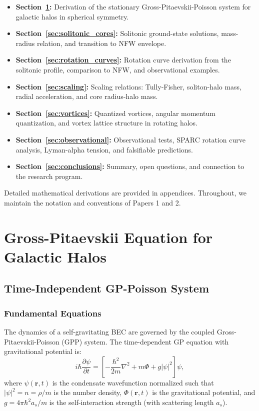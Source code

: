 \documentclass[11pt,a4paper]{article}
\theoremstyle{definition}
\theoremstyle{remark}
\begin{document}
\begin{itemize}[leftmargin=*, itemsep=0.2em]
\item \textbf{Section~\ref{sec:gp_galactic}:} Derivation of the stationary Gross-Pitaevskii-Poisson system for galactic halos in spherical symmetry.
\item \textbf{Section~\ref{sec:solitonic_cores}:} Solitonic ground-state solutions, mass-radius relation, and transition to NFW envelope.
\item \textbf{Section~\ref{sec:rotation_curves}:} Rotation curve derivation from the solitonic profile, comparison to NFW, and observational examples.
\item \textbf{Section~\ref{sec:scaling}:} Scaling relations: Tully-Fisher, soliton-halo mass, radial acceleration, and core radius-halo mass.
\item \textbf{Section~\ref{sec:vortices}:} Quantized vortices, angular momentum quantization, and vortex lattice structure in rotating halos.
\item \textbf{Section~\ref{sec:observational}:} Observational tests, SPARC rotation curve analysis, Lyman-alpha tension, and falsifiable predictions.
\item \textbf{Section~\ref{sec:conclusions}:} Summary, open questions, and connection to the research program.
\end{itemize}

Detailed mathematical derivations are provided in appendices. Throughout, we maintain the notation and conventions of Papers 1 and 2.

\section{Gross-Pitaevskii Equation for Galactic Halos}
\label{sec:gp_galactic}

\subsection{Time-Independent GP-Poisson System}
\label{sec:gp_poisson}

\subsubsection{Fundamental Equations}

The dynamics of a self-gravitating BEC are governed by the coupled Gross-Pitaevskii-Poisson (GPP) system. The time-dependent GP equation with gravitational potential is:
\begin{equation}
\label{eq:GP_time_dependent}
i\hbar \frac{\partial \psi}{\partial t} = \left[-\frac{\hbar^2}{2m}\nabla^2 + m\Phi + g|\psi|^2\right]\psi,
\end{equation}
where $\psi(\mathbf{r},t)$ is the condensate wavefunction normalized such that $|\psi|^2 = n = \rho/m$ is the number density, $\Phi(\mathbf{r},t)$ is the gravitational potential, and $g = 4\pi\hbar^2 a_s/m$ is the self-interaction strength (with scattering length $a_s$).
\end{document}
